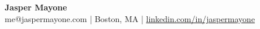 \documentclass[10pt,letterpaper]{article}
\begin{document}
\begin{center}
    {\LARGE \textbf{Jasper Mayone}} \\[2pt]
    me@jaspermayone.com | Boston, MA | \href{https://linkedin.com/in/jaspermayone}{linkedin.com/in/jaspermayone}
\end{center}

\vspace{-2pt}
\end{document}
